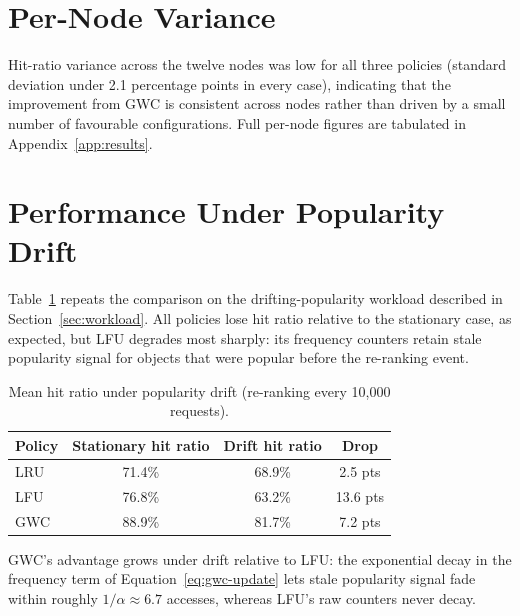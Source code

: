 \section{Per-Node Variance}
Hit-ratio variance across the twelve nodes was low for all three policies (standard
deviation under 2.1 percentage points in every case), indicating that the improvement from
GWC is consistent across nodes rather than driven by a small number of favourable
configurations. Full per-node figures are tabulated in Appendix~\ref{app:results}.

\section{Performance Under Popularity Drift}
\label{sec:drift-results}
Table~\ref{tab:drift-results} repeats the comparison on the drifting-popularity workload
described in Section~\ref{sec:workload}. All policies lose hit ratio relative to the
stationary case, as expected, but LFU degrades most sharply: its frequency counters
retain stale popularity signal for objects that were popular before the re-ranking event.

\begin{table}[h]
  \centering
  \caption{Mean hit ratio under popularity drift (re-ranking every 10,000 requests).}
  \label{tab:drift-results}
  \begin{tabular}{@{}lccc@{}}
    \toprule
    \textbf{Policy} & \textbf{Stationary hit ratio} & \textbf{Drift hit ratio} & \textbf{Drop} \\
    \midrule
    LRU  & 71.4\% & 68.9\% & 2.5 pts \\
    LFU  & 76.8\% & 63.2\% & 13.6 pts \\
    GWC  & 88.9\% & 81.7\% & 7.2 pts \\
    \bottomrule
  \end{tabular}
\end{table}

\begin{keytakeaway}
GWC's advantage grows under drift relative to LFU: the exponential decay in the frequency
term of Equation~\ref{eq:gwc-update} lets stale popularity signal fade within roughly
$1/\alpha \approx 6.7$ accesses, whereas LFU's raw counters never decay.
\end{keytakeaway}
